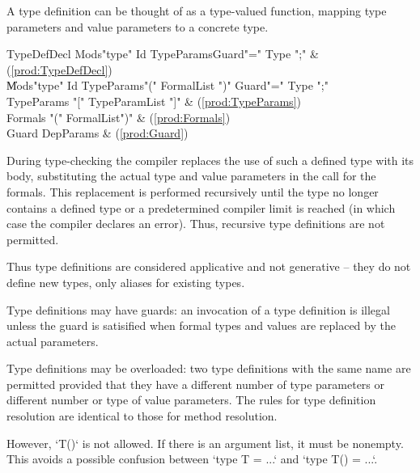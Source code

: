 A type definition can be thought of as a type-valued function,
mapping type parameters and value parameters to a concrete type.

\begin{bbgrammar}
         TypeDefDecl \: Mods\opt \xcd"type" Id TypeParams\opt Guard\opt \xcd"=" Type \xcd";" & (\ref{prod:TypeDefDecl}) \\
                     \| Mods\opt \xcd"type" Id TypeParams\opt \xcd"(" FormalList \xcd")" Guard\opt \xcd"=" Type \xcd";" \\
          TypeParams \: \xcd"[" TypeParamList \xcd"]" & (\ref{prod:TypeParams}) \\
             Formals \: \xcd"(" FormalList\opt \xcd")" & (\ref{prod:Formals}) \\
               Guard \: DepParams & (\ref{prod:Guard}) \\
\end{bbgrammar}

\noindent 
During type-checking the compiler replaces the use of such a defined
type with its body, substituting the actual type and value parameters
in the call for the formals. This replacement is performed recursively
until the type no longer contains a defined type or a predetermined
compiler limit is reached (in which case the compiler declares an
error). Thus, recursive type definitions are not permitted.

Thus type definitions are considered applicative and not generative --
they do not define new types, only aliases for existing types.

\label{TypeDefGuard}
Type definitions may have guards: an invocation of a type definition
is illegal unless the guard is satisified when formal types and values
are replaced by the actual parameters.

Type definitions may be overloaded: two type definitions with
the same name are permitted provided that they have a different number
of type parameters or different number or type of value parameters.  The rules
for type definition resolution are identical to those for method resolution.

However, \xcd`T()` is not allowed. If there is an argument list, it must be
nonempty.  This avoids a possible confusion between 
\xcd`type T = ...` and \xcd`type T() = ...`.  

